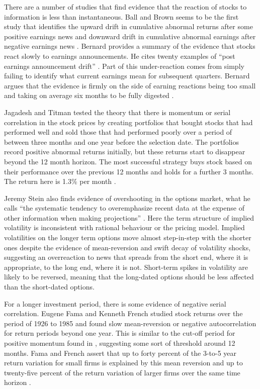 \documentclass[12pt, a4paper, oneside]{article} %
\begin{document}
There are a number of studies that find evidence that the reaction of stocks to information is less than instantaneous.  Ball and Brown seems to be the first study that identifies the upward drift in cumulative abnormal returns after some positive earnings news and downward drift in cumulative abnormal earnings after negative earnings news \citep{BallBrown}.  Bernard provides a summary of the evidence that stocks react slowly to earnings announcements.  He cites twenty examples of ``post earnings announcement drift'' \citep[p. 303]{BernardDrift}.  Part of this under-reaction comes from simply failing to identify what current earnings mean for subsequent quarters.    Bernard argues that the evidence is firmly on the side of earning reactions being too small and taking on average six months to be fully digested \citep[p. 305]{BernardDrift}. 

Jagadesh and Titman tested the theory that there is momentum or serial correlation in the stock prices by creating portfolios that bought stocks that had performed well and sold those that had performed poorly over a period of between three months and one year before the selection date.  The portfolios record positive abnormal returns initially, but these returns start to disappear beyond the 12 month horizon.  The most successful strategy buys stock based on their performance over the previous 12 months and holds for a further 3 months.  The return here is 1.3\% per month \citep{Jagadeesh}.   

Jeremy Stein also finds evidence of overshooting in the options market, what he calls ``the systematic tendency to overemphasize recent data at the expense of other information when making projections'' \citep[p 1011]{SteinOptions}. Here the term structure of implied volatility is inconsistent with rational behaviour or the pricing model.  Implied volatilities on the longer term options move almost step-in-step with the shorter ones despite the evidence of mean-reversion and swift decay of volatility shocks, suggesting an overreaction to news that spreads from the short end, where it is appropriate, to the long end, where it is not.   Short-term spikes in volatility are likely to be reversed, meaning that the long-dated options should be less affected than the short-dated options. 

For a longer investment period, there is some evidence of negative serial correlation.  Eugene Fama and Kenneth French studied stock returns over the period of 1926 to 1985 and found slow mean-reversion or negative autocorrelation for return periods beyond one year.  This is similar to the cut-off period for positive momentum found in \citep{Jagadeesh}, suggesting some sort of threshold around 12 months.  Fama and French assert that up to forty percent of the 3-to-5 year return variation for small firms is explained by this mean reversion and up to twenty-five percent of the return variation of larger firms over the same time horizon \citep{FrenchFamaPermanent}. 
\end{document}

